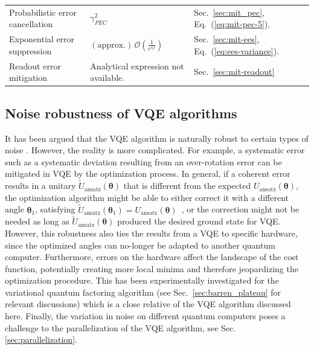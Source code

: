 \begin{table}[ht]
\begin{tabularx}{\textwidth}{llll}
        \\  %
        Probabilistic error cancellation \cite{temmeErrorMitigationShortDepth2017}& $\gamma_{PEC}^2$ & Sec.~\ref{sec:mit_pec}, Eq.~(\ref{eq:mit-pec-5}).
        \\  %
        Exponential error suppression \cite{koczorExponentialErrorSuppression2021,hugginsVirtualDistillationQuantum2021} & $\mathrm{(approx.)}\,\mathcal{O}(\frac{1}{\epsilon^{4f}})$ 
        & Sec.~\ref{sec:mit-ees}, Eq.~(\ref{eq:ees-variance}).
        \\  %
        Readout error mitigation & Analytical expression not available. & Sec.~\ref{sec:mit-readout}
        \\ 
        \bottomrule
    \end{tabularx}
\end{table}

\subsection{Noise robustness of VQE algorithms}

It has been argued that the VQE algorithm is naturally robust to certain types of noise \cite{mccleanTheoryVariationalHybrid2015}.
However, the reality is more complicated. For example, a systematic error such as a systematic deviation resulting from an over-rotation error can be mitigated in VQE by the optimization process. In general, if a coherent error results in a unitary $\tilde{U}_{\mathrm{ansatz}}( \boldsymbol{\theta} )$ that is different from the expected $U_{\mathrm{ansatz}}( \boldsymbol{\theta} )$, the optimization algorithm might be able to either correct it with a different angle $\boldsymbol{\theta} _{1}$, satisfying $\tilde{U}_{\mathrm{ansatz}}( \boldsymbol{\theta} _{1}) =U_{\mathrm{ansatz}}( \boldsymbol{\theta} )$~\cite{yuanTheoryVariationalQuantum2019}, or the correction might not be needed as long as $\tilde{U}_{\mathrm{ansatz}}( \boldsymbol{\theta} )$ produced the desired ground state for VQE. However, this robustness also ties the results from a VQE to specific hardware, since the optimized angles can no-longer be adapted to another quantum computer.
Furthermore, errors on the hardware affect the landscape of the cost function, potentially creating more local minima and therefore jeopardizing the optimization procedure. This has been experimentally investigated for the variational quantum factoring algorithm \cite{karamlouAnalyzingPerformanceVariational2021} (see Sec.~\ref{sec:barren_plateau} for relevant discussions) which is a close relative of the VQE algorithm discussed here. Finally, the variation in noise on different quantum computers poses a challenge to the parallelization of the VQE algorithm, see Sec. \ref{sec:parallelization}.

% 
